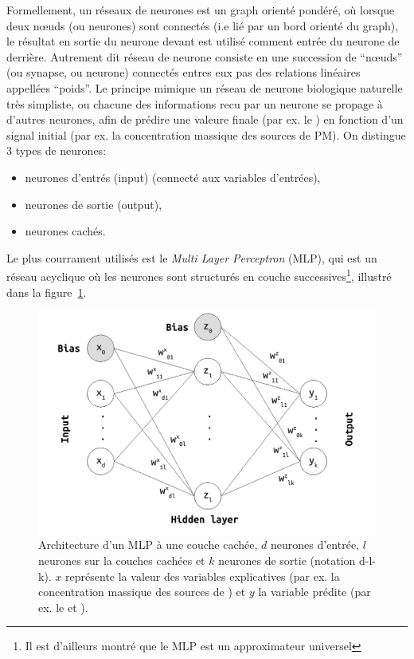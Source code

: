 Formellement, un réseaux de neurones est un graph orienté pondéré, où lorsque deux
nœuds (ou neurones) sont connectés (i.e lié par un bord orienté du graph), le résultat en
sortie du neurone devant est utilisé comment entrée du neurone de derrière.
Autrement dit réseau de neurone consiste en une succession de ``nœuds'' (ou synapse, ou
neurone) connectés entres eux pas des relations linéaires appellées ``poids''. Le principe
mimique un réseau de neurone biologique naturelle très simpliste, ou chacune des
informations recu par un neurone se propage à d'autres neurones, afin de prédire une
valeure finale (par ex. le \POv) en fonction d'un signal initial (par ex. la
concentration massique des sources de PM).
On distingue 3 types de neurones:
\begin{itemize}
    \item neurones d'entrés (input) (connecté aux variables d'entrées),
    \item neurones de sortie (output),
    \item neurones cachés.
\end{itemize}
Le plus courrament utilisés est le \textit{Multi Layer Perceptron} (MLP), qui est un
réseau acyclique où les neurones sont structurés en couche successives\footnote{Il est
d'ailleurs montré que le MLP est un approximateur universel}, illustré dans la
figure~\ref{fig:MLP_architecture}.

\begin{figure}[ht]
    \centering
    \includegraphics[width=0.7\linewidth]{figures/chapter05/MLP_architecture.pdf}
    \caption{Architecture d'un MLP à une couche cachée, $d$ neurones d'entrée, $l$
    neurones sur la couches cachées et $k$ neurones de sortie (notation d-l-k). $x$
    représente la valeur des variables explicatives (par ex. la concentration massique des
    sources de \PMdix) et $y$ la variable prédite (par ex. le \POAAv{} et \PODTTv).}%
    \label{fig:MLP_architecture}
\end{figure}

